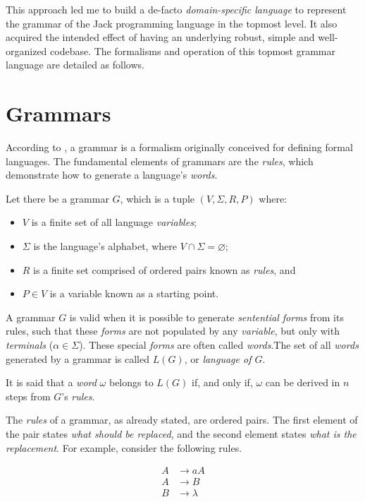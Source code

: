 \documentclass[a4paper,11pt,oneside]{article}
\begin{document}
This approach led me to build a de-facto \emph{domain-specific language}
to represent the grammar of the Jack programming language in the
topmost level. It also acquired the intended effect of having an
underlying robust, simple and well-organized codebase. The formalisms
and operation of this topmost grammar language are detailed as follows.

\section{Grammars}
\label{sec:org87e6550}

According to \cite{newton2006}, a grammar is a formalism originally
conceived for defining formal languages. The fundamental elements of
grammars are the \emph{rules}, which demonstrate how to generate a language's
\emph{words}.

Let there be a grammar \(G\), which is a tuple \((V, \Sigma, R, P)\)
where:

\begin{itemize}
\item \(V\) is a finite set of all language \emph{variables};
\item \(\Sigma\) is the language's alphabet, where \(V \cap \Sigma =
  \varnothing\);
\item \(R\) is a finite set comprised of ordered pairs known as \emph{rules}, and
\item \(P \in V\) is a variable known as a starting point.
\end{itemize}

A grammar \(G\) is valid when it is possible to generate \emph{sentential
forms} from its rules, such that these \emph{forms} are not populated by any
\emph{variable}, but only with \emph{terminals} (\(\alpha \in \Sigma\)). These special
\emph{forms} are often called \emph{words}.The set of all \emph{words} generated by a
grammar is called \(L(G)\), or \emph{language of \(G\)}.

It is said that a \emph{word} \(\omega\) belongs to \(L(G)\) if, and only if,
\(\omega\) can be derived in \(n\) steps from \(G\)'s \emph{rules}.

The \emph{rules} of a grammar, as already stated, are ordered pairs. The
first element of the pair states \emph{what should be replaced}, and the
second element states \emph{what is the replacement}. For example, consider
the following rules.

\begin{align}
A &\rightarrow aA\\
A &\rightarrow B\\
B &\rightarrow \lambda
\end{align}
\end{document}
